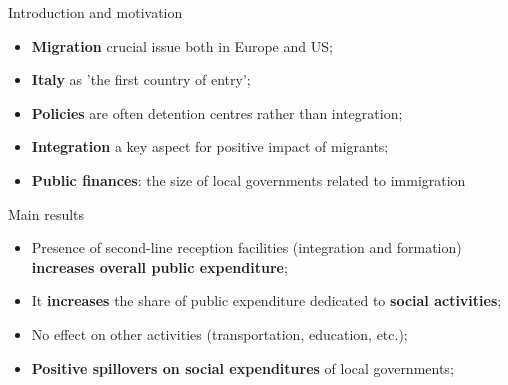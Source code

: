 \documentclass[xcolor={dvipsnames}]{beamer}
\begin{document}
\begin{frame}{Introduction and motivation}

\begin{itemize} 
\justifying

\item \textbf{Migration} crucial issue both in Europe and US; \\

\vspace{10}

\item \textbf{Italy} as 'the first country of entry';

\vspace{10}

\item \textbf{Policies} are often detention centres rather than integration; \\

\vspace{10}

\item \textbf{Integration} a key aspect for positive impact of migrants; \\

\vspace{10}

\item \textbf{Public finances}: the size of local governments related to immigration \\

\end{itemize}

\end{frame}

\begin{frame}{Main results}


\begin{itemize}
\justifying
\item Presence of second-line reception facilities (integration and formation) \textbf{increases overall public expenditure}; \\ 

\vspace{5}

\item It \textbf{increases} the share of public expenditure dedicated to \textbf{social activities}; \\

\vspace{5}

\item No effect on other activities (transportation, education, etc.); \\

\vspace{5}

\item \textbf{Positive spillovers on social expenditures} of local governments; 
\end{itemize}
    
\end{frame}
\end{document}
